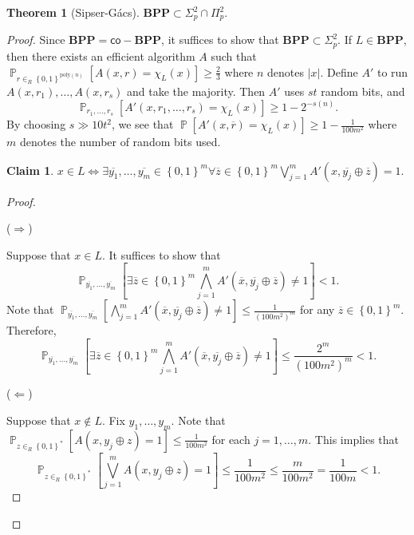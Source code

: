 \documentclass[10pt,letterpaper,cm]{nupset}
\theoremstyle{definition}
\theoremstyle{theorem}
\newtheorem{theorem}[definition]{Theorem}
\newtheorem*{claim}{Claim}
\theoremstyle{remark}
\newcommand{\1}{\mathbf{1}}
\newcommand{\0}{\vec 0}
\DeclareMathOperator{\pr}{\mathbb{P}}
\begin{document}
\begin{theorem}[Sipser-G\'acs]
$\mathbf{BPP} \subset \Sigma^2_p \cap \Pi^2_p$.
\end{theorem}
\begin{proof}
Since $\mathbf{BPP} = \mathsf{co}{-}\mathbf{BPP}$, it suffices to show that $\mathbf{BPP} \subset \Sigma^2_p$. If $L \in \mathbf{BPP}$, then there exists an efficient algorithm $A$ such that $\pr_{r \in_R \left\{0,1\right\}^{\text{poly}(n)}}\left[A(x,r) = \chi_L(x)\right] \geq \frac{2}{3}$ where $n$ denotes $\left\lvert{x}\right\rvert$. Define $A'$ to run $A(x, r_1), \ldots, A(x, r_s)$ and take the majority. Then $A'$ uses $st$ random bits, and $$\pr_{r_1, \ldots, r_s}\left[A'(x, r_1, \ldots, r_s) =\chi_L(x)\right] \geq 1 - 2^{{-}s(n)}.$$ By choosing $s \gg 10t^2$, we see that $\pr\left[A'(x, \overline{r}) = \chi_L(x)\right] \geq 1 -\frac{1}{100m^2}$ where $m$ denotes the number of random bits used. 
\begin{claim}
$x \in L \iff \exists \overline{y_1}, \ldots, \overline{y_m} \in \left\{0,1\right\}^m \forall \overline{z} \in \left\{0,1\right\}^m \bigvee_{j=1}^m A'\left(x, \overline{y_j} \oplus \overline{z}\right)=1$.
\end{claim}

\begin{proof} $ $

($\Longrightarrow$) 

\smallskip

Suppose that $x \in L$. It suffices to show that $$   \pr_{\overline{y_1}, \ldots, \overline{y_m}} \left[\exists \overline{z} \in \left\{0,1\right\}^m \bigwedge_{j=1}^m A'\left(\overline{x}, \overline{y_j} \oplus \overline{z}\right) \ne 1 \right] <1   .$$ Note that $\pr_{\overline{y_1}, \ldots, \overline{y_m}} \left[\bigwedge_{j=1}^m  A'\left(\overline{x}, \overline{y_j} \oplus \overline{z}\right) \ne 1 \right] \leq \frac{1}{\left(100m^2\right)^m}$ for any $\overline{z} \in \left\{0,1\right\}^m$. Therefore, $$      \pr_{\overline{y_1}, \ldots, \overline{y_m}}  \left[\exists \overline{z} \in \left\{0,1\right\}^m \bigwedge_{j=1}^m A'\left(\overline{x}, \overline{y_j} \oplus \overline{z}\right) \ne 1 \right ]   \leq \frac{2^m}{(100m^2)^m} <1.$$

\medskip

($\Longleftarrow$)  

\smallskip

Suppose that $x \notin L$. Fix $y_1, \ldots, y_m$. Note that $\pr_{z \in_R \left\{0,1\right\}^{\ast}}[A(x, y_j \oplus z) =1] \leq \frac{1}{100m^2}$ for each $j=1, \ldots, m$. This implies that $$\pr_{z \in_R \left\{0,1\right\}^{\ast}}\left[\bigvee_{j=1}^m A(x, y_j \oplus z) =1\right] \leq \frac{1}{100m^2} \leq \frac{m}{100m^2} = \frac{1}{100m} <1.$$
\end{proof}
\end{proof}
\end{document}
